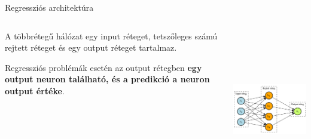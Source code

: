 \documentclass[english, aspectratio=169]{beamer}
\begin{document}
\begin{frame}{Regressziós architektúra}
\begin{columns}
\begin{column}{.5\textwidth}
A többrétegű hálózat egy input réteget, tetszőleges számú rejtett réteget és egy output réteget tartalmaz.\par\medskip
Regressziós problémák esetén az output rétegben \textbf{egy output neuron található, és a predikció a neuron output értéke}. 
\end{column}
\begin{column}{.5\textwidth}
\begin{center}
\includegraphics[width=7cm, height=7cm, keepaspectratio]{graphs/neural_8.png}
\end{center}
\end{column}
\end{columns}
\end{frame}
\end{document}
